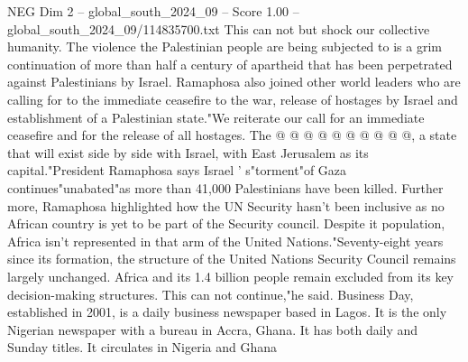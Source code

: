 \begin{textsample}{NEG Dim 2 – global\_south\_2024\_09 – Score 1.00 – global\_south\_2024\_09/114835700.txt}
This can not but shock our collective humanity.
The violence the Palestinian people are being subjected to is a grim continuation of more than half a century of apartheid that has been perpetrated against Palestinians by Israel.
Ramaphosa also joined other world leaders who are calling for to the immediate ceasefire to the war, release of hostages by Israel and establishment of a Palestinian state."We reiterate our call for an immediate ceasefire and for the release of all hostages.
The @ @ @ @ @ @ @ @ @ @, a state that will exist side by side with Israel, with East Jerusalem as its capital."President Ramaphosa says Israel ' s"torment"of Gaza continues"unabated"as more than 41,000 Palestinians have been killed.
Further more, Ramaphosa highlighted how the UN Security hasn't been inclusive as no African country is yet to be part of the Security council.
Despite it population, Africa isn't represented in that arm of the United Nations."Seventy-eight years since its formation, the structure of the United Nations Security Council remains largely unchanged.
Africa and its 1.4 billion people remain excluded from its key decision-making structures.
This can not continue,"he said.
Business Day, established in 2001, is a daily business newspaper based in Lagos.
It is the only Nigerian newspaper with a bureau in Accra, Ghana.
It has both daily and Sunday titles.
It circulates in Nigeria and Ghana

\end{textsample}
